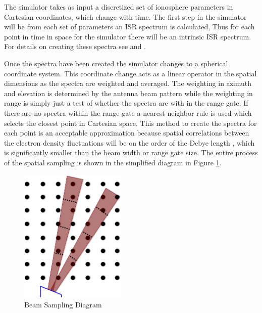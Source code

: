 \documentclass[draft,ras]{agutex}
\begin{document}
\begin{article}
The simulator takes as input a discretized set of ionosphere parameters in Cartesian coordinates, which change with time. The first step in the simulator will be from each set of parameters an ISR spectrum is calculated, Thus for each point in time in space for the simulator there will be an intrinsic ISR spectrum. For details on creating these spectra see \citet{kudeki:milla:1} and \citet{kudeki:milla:2}. 

Once the spectra have been created the simulator changes to a spherical coordinate system. This coordinate change acts as a linear operator in the spatial dimensions as the spectra are weighted and averaged. The weighting in azimuth and elevation is determined by the antenna beam pattern while the weighting in range is simply just a test of whether the spectra are with in the range gate. If there are no spectra within the range gate a nearest neighbor rule is used which selects the closest point in Cartesian space. This method to create the spectra for each point is an acceptable approximation because spatial correlations between the electron density fluctuations will be on the order of the Debye length \citep{farley1969}, which is significantly smaller than the beam width or range gate size. The entire process of the spatial sampling is shown in the simplified diagram in Figure \ref{fig:beamdia}.

\begin{figure}[!t]
\centering
\includegraphics[width=2in]{beamsampling}
\caption{Beam Sampling Diagram}
\label{fig:beamdia}
\end{figure}
 



\end{article}
\end{document}
